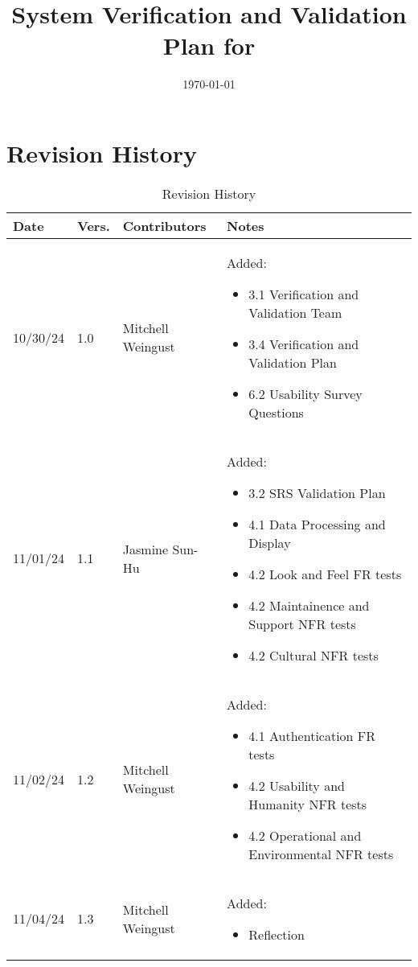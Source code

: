 \documentclass[12pt, titlepage]{article}
\begin{document}
\title{System Verification and Validation Plan for \progname{}} 
\author{\authname}
\date{\today}
	
\maketitle


\section*{Revision History}

\begin{table}[hp]
  \caption{Revision History} \label{TblRevisionHistory}
  \begin{tabularx}{\textwidth}{p{1.5cm}p{1cm}p{3.5cm}X}
  \toprule {\textbf{Date}} & {\textbf{Vers.}} & {\textbf{Contributors}} & {\textbf{Notes}}\\
  \midrule
  10/30/24 & 1.0 & Mitchell Weingust & Added:\begin{itemize}[leftmargin=*]
    \item 3.1 Verification and Validation Team
    \item 3.4 Verification and Validation Plan
    \item 6.2 Usability Survey Questions
  \end{itemize}\\
  11/01/24 & 1.1 & Jasmine Sun-Hu & Added:\begin{itemize}[leftmargin=*]
    \item 3.2 SRS Validation Plan
    \item 4.1 Data Processing and Display
    \item 4.2 Look and Feel FR tests
    \item 4.2 Maintainence and Support NFR tests
    \item 4.2 Cultural NFR tests
  \end{itemize}\\
  11/02/24 & 1.2 & Mitchell Weingust & Added:\begin{itemize}[leftmargin=*]
    \item 4.1 Authentication FR tests
    \item 4.2 Usability and Humanity NFR tests
    \item 4.2 Operational and Environmental NFR tests
  \end{itemize}\\
  11/04/24 & 1.3 & Mitchell Weingust & Added:\begin{itemize}[leftmargin=*]
    \item Reflection
  \end{itemize}\\
  \bottomrule
  \end{tabularx}
  \end{table}
\end{document}
